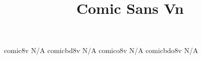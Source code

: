 \documentclass[test]{vnsample}
\title{Comic Sans Vn}
\begin{document}
\begin{shortsample}
 {comic8v}  {N/A}
 {comicbd8v}  {N/A}
 {comico8v}  {N/A}
 {comicbdo8v}  {N/A}
\end{shortsample}
\end{document}
